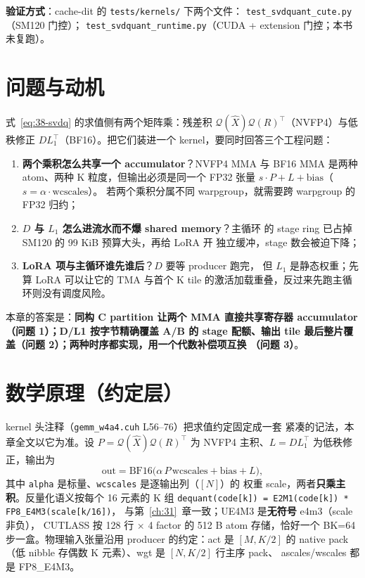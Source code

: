 \textbf{验证方式}：cache-dit 的 \texttt{tests/kernels/} 下两个文件：
\texttt{test\_svdquant\_cute.py}（SM120 门控）；\newline
\texttt{test\_svdquant\_runtime.py}（CUDA + extension 门控；本书未复跑）。

\section{问题与动机}

式~\ref{eq:38-svdq} 的求值侧有两个矩阵乘：残差积
$\mathcal Q(\widehat X)\mathcal Q(R)^{\top}$（NVFP4）与低秩修正
$DL_1^{\top}$（BF16）。把它们装进一个 kernel，要同时回答三个工程问题：

\begin{enumerate}[itemsep=0pt,topsep=2pt]
  \item \textbf{两个乘积怎么共享一个 accumulator}？NVFP4 MMA 与 BF16
        MMA 是两种 atom、两种 K 粒度，但输出必须是同一个 FP32 张量
        $s\cdot P+L+\mathrm{bias}$（$s=\alpha\cdot\mathrm{wcscales}$）。
        若两个乘积分属不同 warpgroup，就需要跨 warpgroup 的 FP32 归约；
  \item \textbf{$D$ 与 $L_1$ 怎么进流水而不爆 shared memory}？主循环
        的 stage ring 已占掉 SM120 的 99 KiB 预算大头，再给 LoRA 开
        独立缓冲，stage 数会被迫下降；
  \item \textbf{LoRA 项与主循环谁先谁后}？$D$ 要等 producer 跑完，
        但 $L_1$ 是静态权重；先算 LoRA 可以让它的 TMA 与首个 K tile
        的激活加载重叠，反过来先跑主循环则没有调度风险。
\end{enumerate}

本章的答案是：\textbf{同构 C partition 让两个 MMA 直接共享寄存器
accumulator（问题 1）；D/L1 按字节精确覆盖 A/B 的 stage 配额、输出
tile 最后整片覆盖（问题 2）；两种时序都实现，用一个代数补偿项互换
（问题 3）}。

\section{数学原理（约定层）}

kernel 头注释（\texttt{gemm\_w4a4.cuh} L56--76）把求值约定固定成一套
紧凑的记法，本章全文以它为准。设 $P=\mathcal Q(\widehat X)\mathcal
Q(R)^{\top}$ 为 NVFP4 主积、$L=DL_1^{\top}$ 为低秩修正，输出为
\begin{equation}
  \mathrm{out}=\mathrm{BF16}\bigl(\alpha\,P\,\mathrm{wcscales}
  +\mathrm{bias}+L\bigr),
  \label{eq:40-contract}
\end{equation}
其中 \texttt{alpha} 是标量、\texttt{wcscales} 是逐输出列（$[N]$）的
权重 scale，两者\textbf{只乘主积}。反量化语义按每个 16 元素的 K 组
\texttt{dequant(code[k]) = E2M1(code[k]) * FP8\_E4M3(scale[k/16])}，
与第~\ref{ch:31}~章一致；UE4M3 是\textbf{无符号} e4m3（scale 非负），
CUTLASS 按 128 行 $\times$ 4 factor 的 512 B atom 存储，恰好一个
BK=64 步一盒。物理输入张量沿用 producer 的约定：act 是 $[M,K/2]$ 的
native pack（低 nibble 存偶数 K 元素）、wgt 是 $[N,K/2]$ 行主序 pack、
ascales/wscales 都是 FP8\_E4M3。


